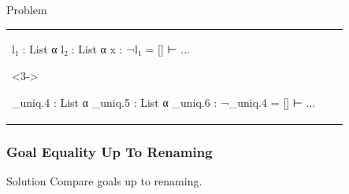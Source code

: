 \begin{frame}[fragile]
\begin{block}{Problem}
\begin{tabular}{lcl}
\begin{minipage}{.4\textwidth}
\begin{onlyenv}
\begin{leancode}
            l₁ : List α
            l₂ : List α
            x : ¬l₁ = []
            ⊢ ...
          \end{leancode}
        \end{onlyenv}
        \begin{onlyenv}<3->
          \begin{leancode}
            _uniq.4 : List α
            _uniq.5 : List α
            _uniq.6 : ¬_uniq.4 = []
            ⊢ ...
          \end{leancode}
        \end{onlyenv}
      \end{minipage}
    \end{tabular}
  \end{block}
\end{frame}

\begin{frame}[fragile]
  \frametitle{Goal Equality Up To Renaming}

  \begin{block}{Solution}
    Compare goals up to renaming.
  \end{block}


\end{frame}
